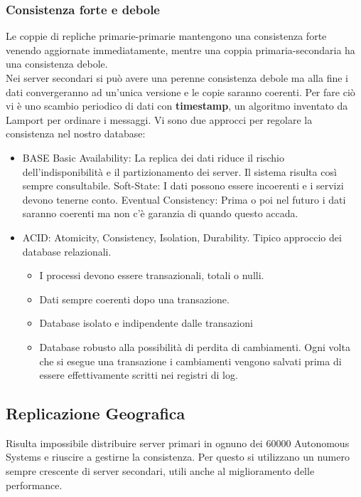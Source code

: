 \documentclass{article}
\begin{document}
		\subsubsection{Consistenza forte e debole}
		Le coppie di repliche primarie-primarie mantengono una consistenza forte venendo aggiornate immediatamente, mentre una coppia primaria-secondaria ha una consistenza debole.\\
		Nei server secondari si può avere una perenne consistenza debole ma alla fine i dati convergeranno ad un'unica versione e le copie saranno coerenti. Per fare ciò vi è uno scambio periodico di dati con \textbf{timestamp}, un algoritmo inventato da Lamport per ordinare i messaggi.
		Vi sono due approcci per regolare la consistenza nel nostro database:
		\begin{itemize}
		    \item BASE
		    \subitem Basic Availability: La replica dei dati riduce il rischio dell'indisponibilità e il partizionamento dei server. Il sistema risulta così sempre consultabile. 
		    \subitem Soft-State: I dati possono essere incoerenti e i servizi devono tenerne conto. 
		    \subitem Eventual Consistency: Prima o poi nel futuro i dati saranno coerenti ma non c'è garanzia di quando questo accada.
		    \item ACID: Atomicity, Consistency, Isolation, Durability. Tipico approccio dei database relazionali.
			\begin{itemize}
				\item I processi devono essere transazionali, totali o nulli.
				\item Dati sempre coerenti dopo una transazione.
				\item Database isolato e indipendente dalle transazioni
				\item Database robusto alla possibilità di perdita di cambiamenti. Ogni volta che si esegue una transazione i cambiamenti vengono salvati prima di essere effettivamente scritti nei registri di log.
			\end{itemize}
		\end{itemize}
		
		\subsection{Replicazione Geografica}
		Risulta impossibile distribuire server primari in ognuno dei 60000 Autonomous Systems e riuscire a gestirne la consistenza. Per questo si utilizzano un numero sempre crescente di server secondari, utili anche al miglioramento delle performance.
		
\end{document}
